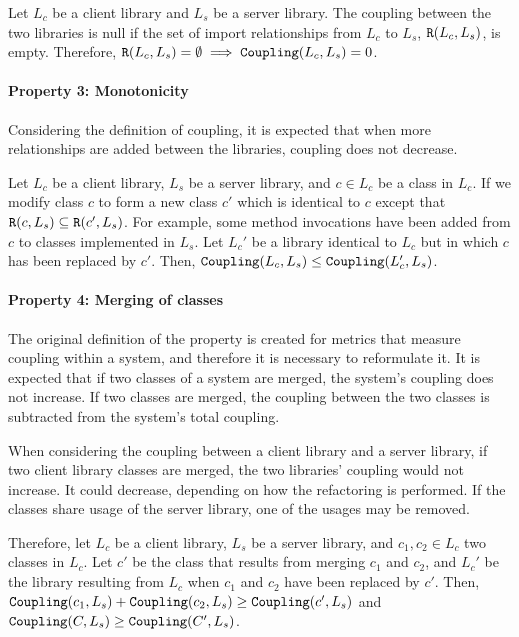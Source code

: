 Let $L_c$ be a client library and $L_s$ be a server library. The coupling between the two libraries is null if the set of import relationships from $L_c$ to $L_s$, $\verb|R|(L_c, L_s)$, is empty. Therefore, $\verb|R|(L_c, L_s) = \emptyset \implies \verb|Coupling|(L_c, L_s) = 0$.

\paragraph{Property 3: Monotonicity}
Considering the definition of coupling, it is expected that when more relationships are added between the libraries, coupling does not decrease.

Let $L_c$ be a client library, $L_s$ be a server library, and $c \in L_c$ be a class in $L_c$. If we modify class $c$ to form a new class $c'$ which is identical to $c$ except that $\verb|R|(c, L_s) \subseteq \verb|R|(c', L_s)$. For example, some method invocations have been added from $c$ to classes implemented in $L_s$. Let $L_c'$ be a library identical to $L_c$ but in which $c$ has been replaced by $c'$. Then, $\verb|Coupling|(L_c, L_s) \le \verb|Coupling|(L_c', L_s)$.

\paragraph{Property 4: Merging of classes}
The original definition of the property is created for metrics that measure coupling within a system, and therefore it is necessary to reformulate it. It is expected that if two classes of a system are merged, the system's coupling does not increase. If two classes are merged, the coupling between the two classes is subtracted from the system's total coupling.

When considering the coupling between a client library and a server library, if two client library classes are merged, the two libraries' coupling would not increase. It could decrease, depending on how the refactoring is performed. If the classes share usage of the server library, one of the usages may be removed.

Therefore, let $L_c$ be a client library, $L_s$ be a server library, and $c_1, c_2 \in L_c$ two classes in $L_c$. Let $c'$ be the class that results from merging  $c_1$ and $c_2$, and $L_c'$ be the library resulting from $L_c$ when $c_1$ and $c_2$ have been replaced by $c'$. Then, $\verb|Coupling|(c_1, L_s) + \verb|Coupling|(c_2, L_s) \ge \verb|Coupling|(c', L_s)$ and $\verb|Coupling|(C, L_s) \ge \verb|Coupling|(C', L_s)$.

